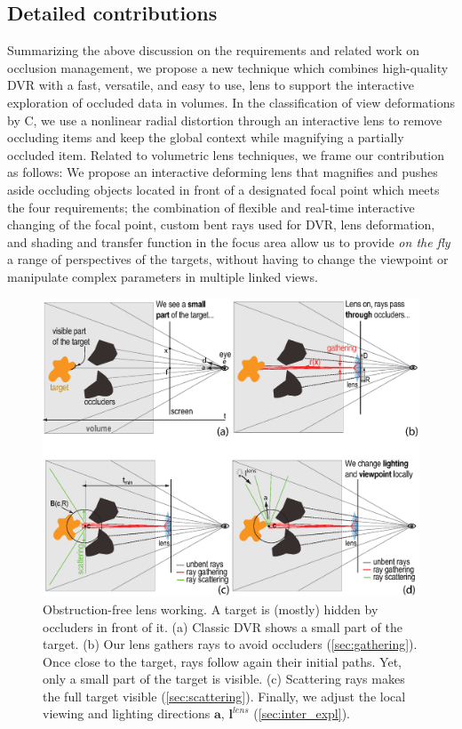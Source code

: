 \subsection{Detailed contributions}
%
Summarizing the above discussion on the requirements and related work on occlusion management, we propose a new technique which combines high-quality DVR with a fast, versatile, and easy to use, lens to support the interactive exploration of occluded data in volumes. In the classification of view deformations by C\cite{595268}, we use a nonlinear radial distortion through an interactive lens to remove occluding items and keep the global context while magnifying a partially occluded item. Related to volumetric lens techniques, we frame our contribution as follows: We propose an interactive deforming lens that magnifies and pushes aside occluding objects located in front of a designated focal point which meets the four requirements; the combination of flexible and real-time interactive changing of the focal point, custom bent rays used for DVR, lens deformation, and shading and transfer function in the focus area allow us to provide \emph{on the fly} a range of perspectives of the targets, without having to change the viewpoint or manipulate complex parameters in multiple linked views.


\begin{figure}
\centering

\includegraphics [width=\textwidth]{images/principle.eps}

\caption[Obstruction-free lens working.]{Obstruction-free lens working. A target is (mostly) hidden by occluders in front of it. (a) Classic DVR shows a small part of the target. (b) Our lens gathers rays to avoid occluders (\autoref{sec:gathering}). Once close to the target, rays follow again their initial paths. Yet, only a small part of the target is visible. (c) Scattering rays makes the full target visible (\autoref{sec:scattering}). Finally, we adjust the local viewing and lighting directions $\mathbf{a}$, $\mathbf{l}^{lens}$ (\autoref{sec:inter_expl}).}
\label{f:fisheye}

\end{figure}
